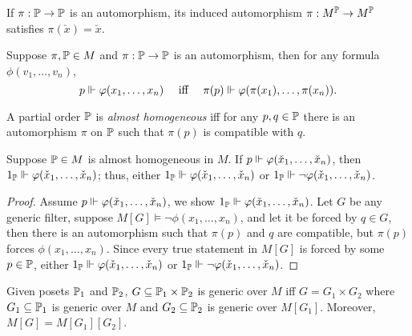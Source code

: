 \begin{observation}
    If \(\pi:\P\to\P\) is an automorphism, its induced automorphism \(\pi: M^\P \to M^\P\) satisfies \(\pi(\check{x}) = \check{x}\).
\end{observation}

\begin{lemma} \label{lemma:forcing_invariant_under_pi}
    Suppose \(\pi, \P\in M\) and \(\pi:\P\to\P\) is an automorphism, then for any formula \(\phi(v_1,\dots,v_n)\),
    \[ p\forces \phi(x_1,\dots,x_n)\quad \text{ iff }\quad \pi(p)\forces \phi(\pi(x_1),\dots,\pi(x_n)).  \]
\end{lemma}

\begin{definition}
    A partial order \(\P\) is \emph{almost homogeneous} iff
    for any \(p,q\in\P\) there is an automorphism \(\pi\) on \(\P\) such that \(\pi(p)\) is compatible with \(q\).
\end{definition}

\begin{proposition} \label{proposition:property_almost_homo}
    Suppose \(\P\in M\) is almost homogeneous in \(M\).
    If \(p\forces \phi(\check{x}_1,\dots,\check{x}_n)\), then \(1_\P\forces \phi(\check{x}_1,\dots,\check{x}_n)\);
    thus, either \(1_\P\forces \phi(\check{x}_1,\dots,\check{x}_n)\) or \(1_\P\forces \lnot\phi(\check{x}_1,\dots,\check{x}_n)\).
\end{proposition}
\begin{proof}
    Assume \(p\forces \phi(\check{x}_1,\dots,\check{x}_n)\), we show \(1_\P\forces \phi(\check{x}_1,\dots,\check{x}_n)\).
    Let \(G\) be any generic filter, suppose \(M[G]\models \lnot\phi(x_1,\dots,x_n)\),
    and let it be forced by \(q\in G\), then there is an automorphism such that \(\pi(p)\) and \(q\) are compatible,
    but \(\pi(p)\) forces \(\phi(x_1,\dots,x_n)\).
    Since every true statement in \(M[G]\) is forced by some \(p\in\P\),
    either \(1_\P\forces \phi(\check{x}_1,\dots,\check{x}_n)\) or \(1_\P\forces \lnot\phi(\check{x}_1,\dots,\check{x}_n)\).
\end{proof}

\begin{lemma}
    \label{lemma:iterated_forcing_product}
    Given posets \(\P_1\) and \(\P_2\),
    \(G\subseteq \P_1\times\P_2\) is generic over \(M\) iff
    \(G = G_1\times G_2\) where \(G_1\subseteq \P_1\) is generic over \(M\) and \(G_2\subseteq \P_2\) is generic over \(M[G_1]\).
    Moreover, \(M[G] = M[G_1][G_2]\).
\end{lemma}

